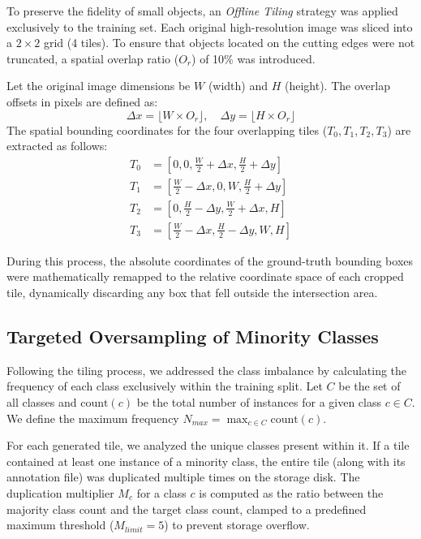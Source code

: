 To preserve the fidelity of small objects, an \textit{Offline Tiling} strategy was applied exclusively to the training set. Each original high-resolution image was sliced into a $2 \times 2$ grid (4 tiles). To ensure that objects located on the cutting edges were not truncated, a spatial overlap ratio ($O_r$) of 10\% was introduced. 

Let the original image dimensions be $W$ (width) and $H$ (height). The overlap offsets in pixels are defined as:
\begin{equation}
    \Delta x = \lfloor W \times O_r \rfloor, \quad \Delta y = \lfloor H \times O_r \rfloor
\end{equation}
The spatial bounding coordinates for the four overlapping tiles ($T_0, T_1, T_2, T_3$) are extracted as follows:
\begin{align}
    T_0 &= \left[0, 0, \frac{W}{2} + \Delta x, \frac{H}{2} + \Delta y\right] \\
    T_1 &= \left[\frac{W}{2} - \Delta x, 0, W, \frac{H}{2} + \Delta y\right] \\
    T_2 &= \left[0, \frac{H}{2} - \Delta y, \frac{W}{2} + \Delta x, H\right] \\
    T_3 &= \left[\frac{W}{2} - \Delta x, \frac{H}{2} - \Delta y, W, H\right]
\end{align}

During this process, the absolute coordinates of the ground-truth bounding boxes were mathematically remapped to the relative coordinate space of each cropped tile, dynamically discarding any box that fell outside the intersection area.

\subsection{Targeted Oversampling of Minority Classes}
Following the tiling process, we addressed the class imbalance by calculating the frequency of each class exclusively within the training split. Let $C$ be the set of all classes and $\text{count}(c)$ be the total number of instances for a given class $c \in C$. We define the maximum frequency $N_{max} = \max_{c \in C} \text{count}(c)$.

For each generated tile, we analyzed the unique classes present within it. If a tile contained at least one instance of a minority class, the entire tile (along with its annotation file) was duplicated multiple times on the storage disk. The duplication multiplier $M_c$ for a class $c$ is computed as the ratio between the majority class count and the target class count, clamped to a predefined maximum threshold ($M_{limit} = 5$) to prevent storage overflow.

